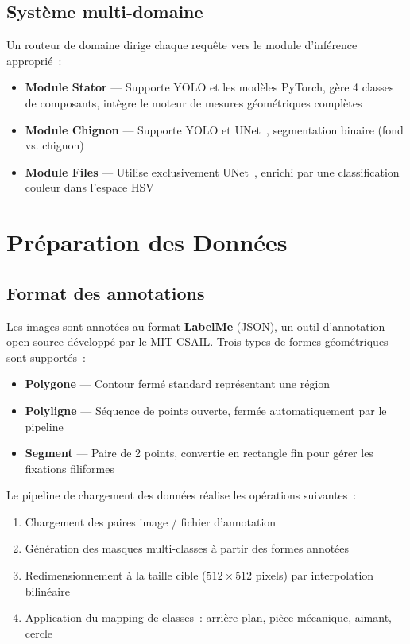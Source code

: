 \documentclass[12pt,a4paper]{report}
\begin{document}
\section{Syst\`eme multi-domaine}

Un routeur de domaine dirige chaque requ\^ete vers le module d'inf\'erence appropri\'e~:
\begin{itemize}
    \item \textbf{Module Stator} --- Supporte YOLO et les mod\`eles PyTorch, g\`ere 4 classes de composants, int\`egre le moteur de mesures g\'eom\'etriques compl\`etes
    \item \textbf{Module Chignon} --- Supporte YOLO et UNet~\cite{ronneberger2015unet}, segmentation binaire (fond vs. chignon)
    \item \textbf{Module Files} --- Utilise exclusivement UNet~\cite{ronneberger2015unet}, enrichi par une classification couleur dans l'espace HSV
\end{itemize}


\chapter{Pr\'eparation des Donn\'ees}

\section{Format des annotations}

Les images sont annot\'ees au format \textbf{LabelMe} (JSON), un outil d'annotation open-source d\'evelopp\'e par le MIT CSAIL. Trois types de formes g\'eom\'etriques sont support\'es~:
\begin{itemize}
    \item \textbf{Polygone} --- Contour ferm\'e standard repr\'esentant une r\'egion
    \item \textbf{Polyligne} --- S\'equence de points ouverte, ferm\'ee automatiquement par le pipeline
    \item \textbf{Segment} --- Paire de 2 points, convertie en rectangle fin pour g\'erer les fixations filiformes
\end{itemize}

Le pipeline de chargement des donn\'ees r\'ealise les op\'erations suivantes~:
\begin{enumerate}
    \item Chargement des paires image / fichier d'annotation
    \item G\'en\'eration des masques multi-classes \`a partir des formes annot\'ees
    \item Redimensionnement \`a la taille cible ($512 \times 512$ pixels) par interpolation bilin\'eaire
    \item Application du mapping de classes~: arri\`ere-plan, pi\`ece m\'ecanique, aimant, cercle
\end{enumerate}
\end{document}
